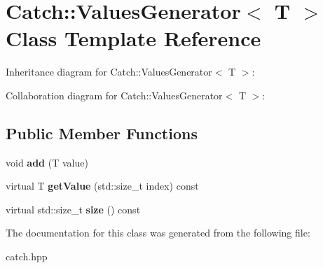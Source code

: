 \hypertarget{classCatch_1_1ValuesGenerator}{}\section{Catch\+:\+:Values\+Generator$<$ T $>$ Class Template Reference}
\label{classCatch_1_1ValuesGenerator}


Inheritance diagram for Catch\+:\+:Values\+Generator$<$ T $>$\+:


Collaboration diagram for Catch\+:\+:Values\+Generator$<$ T $>$\+:
\subsection*{Public Member Functions}
\begin{DoxyCompactItemize}
\item 
void {\bfseries add} (T value)\hypertarget{classCatch_1_1ValuesGenerator_a8412c8ce5d9d4fc6ff06d5246d56d538}{}\label{classCatch_1_1ValuesGenerator_a8412c8ce5d9d4fc6ff06d5246d56d538}

\item 
virtual T {\bfseries get\+Value} (std\+::size\+\_\+t index) const \hypertarget{classCatch_1_1ValuesGenerator_a60599dd67096ff108471f64ee42acd9d}{}\label{classCatch_1_1ValuesGenerator_a60599dd67096ff108471f64ee42acd9d}

\item 
virtual std\+::size\+\_\+t {\bfseries size} () const \hypertarget{classCatch_1_1ValuesGenerator_a98a80bb0dd682c44e82e4a75e98c4682}{}\label{classCatch_1_1ValuesGenerator_a98a80bb0dd682c44e82e4a75e98c4682}

\end{DoxyCompactItemize}


The documentation for this class was generated from the following file\+:\begin{DoxyCompactItemize}
\item 
catch.\+hpp\end{DoxyCompactItemize}
